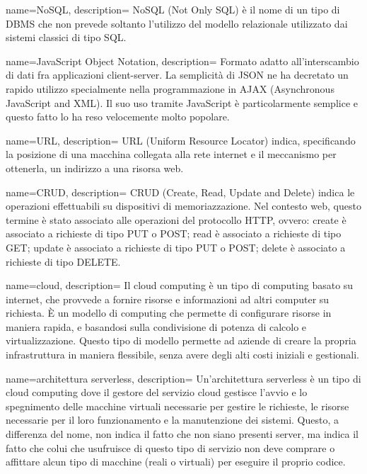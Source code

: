  {
  name=NoSQL,
  description={
NoSQL (Not Only SQL) è il nome di un tipo di DBMS che non prevede soltanto
l'utilizzo del modello relazionale utilizzato dai sistemi classici di tipo SQL.
}
}

 {
  name=JavaScript Object Notation,
  description={
Formato adatto all’interscambio di dati fra applicazioni client-server. La
semplicità di JSON ne ha decretato un rapido utilizzo specialmente nella
programmazione in AJAX (Asynchronous JavaScript and XML). Il suo uso tramite
JavaScript è particolarmente semplice e questo fatto lo ha reso velocemente
molto popolare.
}
}

 {
  name=URL,
  description={
URL (Uniform Resource Locator) indica, specificando la posizione di una macchina
collegata alla rete internet e il meccanismo per ottenerla, un indirizzo a una
risorsa web.
}
}

 {
  name=CRUD,
  description={
CRUD (Create, Read, Update and Delete) indica le operazioni effettuabili su
dispositivi di memoriazzazione. Nel contesto web, questo termine è stato
associato alle operazioni del protocollo HTTP, ovvero: create è
associato a richieste di tipo PUT o POST; read è associato a richieste di tipo
GET; update è associato a richieste di tipo PUT o POST; delete è associato a
richieste di tipo DELETE.
}
}

 {
  name=cloud,
  description={
Il cloud computing è un tipo di computing basato su internet, che provvede a
fornire risorse e informazioni ad altri computer su richiesta. È un modello di
computing che permette di configurare risorse in maniera rapida, e basandosi
sulla condivisione di potenza di calcolo e virtualizzazione. Questo tipo di
modello permette ad aziende di creare la propria infrastruttura in maniera
flessibile, senza avere degli alti costi iniziali e gestionali.
}
}

 {
  name=architettura serverless,
  description={
Un'architettura serverless è un tipo di cloud computing dove il gestore del
servizio cloud gestisce l'avvio e lo spegnimento delle macchine virtuali
necessarie per gestire le richieste, le risorse necessarie per il loro
funzionamento e la manutenzione dei sistemi. Questo, a differenza del nome, non
indica il fatto che non siano presenti server, ma indica il fatto che colui che
usufruisce di questo tipo di servizio non deve comprare o affittare alcun tipo
di macchine (reali o virtuali) per eseguire il proprio codice.
}
}


